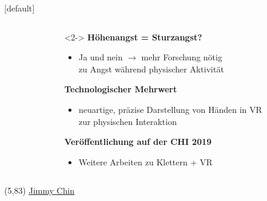 {
	[default]
	\begin{frame}[plain]{\color{primary}{Fazit \& Ausblick}}
	
	\begin{columns}
		\begin{column}{0.4\textwidth}

		\end{column}
		\begin{column}{0.6\textwidth}
			\begin{exampleblock}{}<2->
				\textbf{Höhenangst = \textcolor{secondary}{Sturzangst?}}
				\begin{itemize}[label=\textcolor{tertiary}{}]
					\item Ja und nein $\rightarrow$ mehr Forschung nötig\\zu Angst während physischer Aktivität
				\end{itemize}
				\textbf{Technologischer Mehrwert}
				\begin{itemize}[label=\textcolor{tertiary}{}]
					\item neuartige, präzise Darstellung von Händen in VR\\zur physischen Interaktion
				\end{itemize}
				\textbf{Veröffentlichung auf der \textcolor{secondary}{CHI 2019}}
				\begin{itemize}[label=\textcolor{tertiary}{}]
					\item Weitere Arbeiten zu Klettern + VR
				\end{itemize}
			\end{exampleblock}
		\end{column}
	\end{columns}
	
	\begin{textblock}{50}(5,83)
		\href{http://www.accidentofgeography.com/alex-honnold-epic-el-capitan-triumph/}{	\textcolor{tertiary}{{\small \textcopyright Jimmy Chin}}} 
	\end{textblock}
	\end{frame}
}


